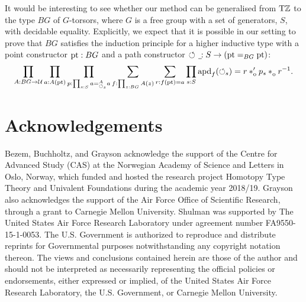 \documentclass[a4paper,12pt]{amsart}
\begin{document}
It would be interesting to see whether our method can be generalised
from ${\mathrm{T}\mathbb{Z}}$ to the type $BG$ of $G$-torsors, where $G$ is a free group with
a set of generators, $S$, with decidable equality.
Explicitly, we expect that it is possible in our setting to
prove that $BG$ satisfies the induction principle for a higher inductive
type with a point constructor ${\mathord{\mathrm{pt}}} : BG$ and a path constructor
$\Zloop_{\blank} : S \to (\pt =_{BG} \pt)$:
\[
  \prod_{A: BG\to\UU}
  \prod_{a: A(\pt)}
  \prod_{p: \prod_{s:S} a=^A_{\Zloop_s} a}
  \sum_{f: \prod_{z:BG} A(z)}
  \sum_{r: f(\pt)= a}
  \prod_{s:S}{\apd{f}(\Zloop_s) = r\ctop p_s \cto r^{-1}}.
\]

\section{Acknowledgements}
Bezem, Buchholtz, and Grayson acknowledge the support of the Centre for Advanced Study (CAS)
at the Norwegian Academy of Science and Letters
in Oslo, Norway, which funded and hosted the research project Homotopy Type Theory and Univalent Foundations during the academic year 2018/19.
Grayson also acknowledges the support of the Air Force Office of Scientific Research, through a grant to Carnegie Mellon University. 
Shulman was supported by The United States Air Force Research
    Laboratory under agreement number FA9550-15-1-0053.  The
    U.S. Government is authorized to reproduce and distribute reprints
    for Governmental purposes notwithstanding any copyright notation
    thereon.  The views and conclusions contained herein are those of
    the author and should not be interpreted as necessarily
    representing the official policies or endorsements, either
    expressed or implied, of the United States Air Force Research
    Laboratory, the U.S. Government, or Carnegie Mellon University.

\raggedright
\printbibliography
\end{document}
